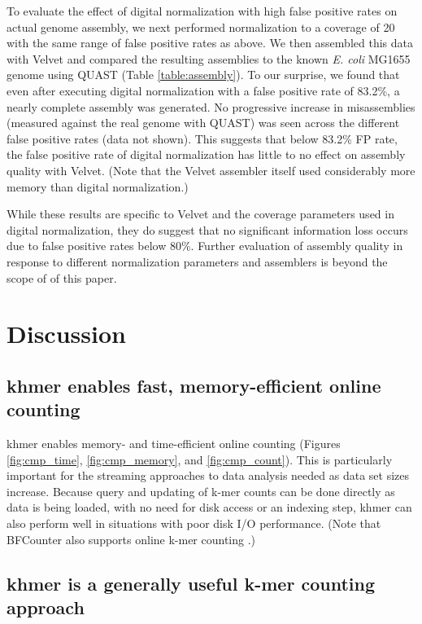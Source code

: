 \documentclass[10pt]{article}
\begin{document}
To evaluate the effect of digital normalization with high false
positive rates on actual genome assembly, we next performed
normalization to a coverage of 20 with the same range of false
positive rates as above.  We then assembled this data with Velvet
\cite{Zerbino2008} and compared the resulting assemblies to the known
     {\em E. coli} MG1655 genome using QUAST (Table
     \ref{table:assembly}).  To our surprise, we found that even after
     executing digital normalization with a false positive rate of
     83.2\%, a nearly complete assembly was generated.  No progressive
     increase in misassemblies (measured against the real genome with
     QUAST) was seen across the different false positive rates (data
     not shown). This suggests that below 83.2\% FP rate, the false
     positive rate of digital normalization has little to no effect on
     assembly quality with Velvet.  (Note that the Velvet assembler
     itself used considerably more memory than digital normalization.)


While these results are specific to Velvet and the coverage parameters
used in digital normalization, they do suggest that no significant
information loss occurs due to false positive rates below 80\%.
Further evaluation of assembly quality in response to different
normalization parameters and assemblers is beyond the scope of of this
paper.

\section*{Discussion}


\subsection*{khmer enables fast, memory-efficient online counting}

khmer enables memory- and time-efficient online counting (Figures
\ref{fig:cmp_time}, \ref{fig:cmp_memory}, and \ref{fig:cmp_count}).
This is particularly important for the streaming approaches to data
analysis needed as data set sizes increase.  Because query and
updating of k-mer counts can be done directly as data is being loaded,
with no need for disk access or an indexing step, khmer can also
perform well in situations with poor disk I/O performance.  (Note that
BFCounter also supports online k-mer counting \cite{Melsted2011}.)

\subsection*{khmer is a generally useful k-mer counting approach}
\end{document}
